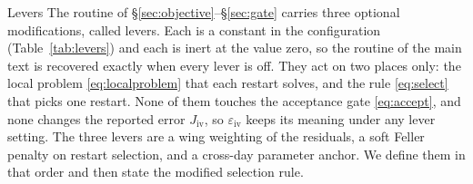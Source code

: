 \documentclass[a4paper, 11pt, reqno]{amsart}
\makeatletter
\def\section{\@startsection{section}{1}%
	\z@{.7\linespacing\@plus\linespacing}{.5\linespacing}%
	{\normalfont\bfseries\centering}}
\newcommand{\ConstIvGateSym}{\varepsilon_{\mathrm{iv}}}  \newcommand{\ConstIvGateVal}{0.02}
\makeatother
\begin{document}
	\section{Levers}\label{sec:levers}
		The routine of \S\ref{sec:objective}--\S\ref{sec:gate} carries three optional modifications,
		called levers. Each is a constant in the configuration (Table~\ref{tab:levers}) and each is
		inert at the value zero, so the routine of the main text is recovered exactly when every lever
		is off. They act on two places only: the local problem \eqref{eq:localproblem} that each restart
		solves, and the rule \eqref{eq:select} that picks one restart. None of them touches the
		acceptance gate \eqref{eq:accept}, and none changes the reported error $J_{\mathrm{iv}}$, so
		$\ConstIvGateSym$ keeps its meaning under any lever setting. The three levers are a wing
		weighting of the residuals, a soft Feller penalty on restart selection, and a cross-day
		parameter anchor. We define them in that order and then state the modified selection rule.
\end{document}
